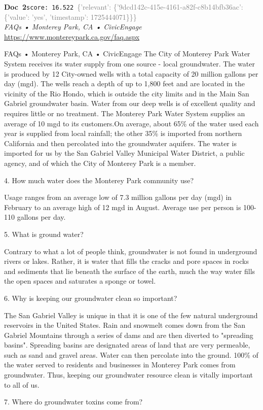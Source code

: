 \documentclass[a4paper,11pt]{article}
\begin{document}
\begin{docenv}
{\footnotesize\textcolor{doccolor}{\textbf{Doc~2}}}\hfill{\tiny\texttt{score:~16.522}}\ {\tiny\textcolor{gray}{\{'relevant': \{'9dcd142c-415e-4161-a82f-c8b14bfb36ac': \{'value': 'yes', 'timestamp': 1725444071\}\}\}}}\\[3pt]
{\small\textit{FAQs • Monterey Park, CA • CivicEngage}}\\[2pt]
{\tiny\url{https://www.montereypark.ca.gov/faq.aspx}}\\[4pt]
{\footnotesize FAQs • Monterey Park, CA • CivicEngage
The City of Monterey Park Water System receives its water supply from one source - local groundwater. The water is produced by 12 City-owned wells with a total capacity of 20 million gallons per day (mgd). The wells reach a depth of up to 1,800 feet and are located in the vicinity of the Rio Hondo, which is outside the city limits and in the Main San Gabriel groundwater basin. Water from our deep wells is of excellent quality and requires little or no treatment. The Monterey Park Water System supplies an average of 10 mgd to its customers.On average, about 65\% of the water used each year is supplied from local rainfall; the other 35\% is imported from northern California and then percolated into the groundwater aquifers. The water is imported for us by the San Gabriel Valley Municipal Water District, a public agency, and of which the City of Monterey Park is a member.	

4.
How much water does the Monterey Park community use?

Usage ranges from an average low of 7.3 million gallons per day (mgd) in February to an average high of 12 mgd in August. Average use per person is 100-110 gallons per day.	

5.
What is ground water?

Contrary to what a lot of people think, groundwater is not found in underground rivers or lakes. Rather, it is water that fills the cracks and pore spaces in rocks and sediments that lie beneath the surface of the earth, much the way water fills the open spaces and saturates a sponge or towel. 	

6.
Why is keeping our groundwater clean so important?

The San Gabriel Valley is unique in that it is one of the few natural underground reservoirs in the United States. Rain and snowmelt comes down from the San Gabriel Mountains through a series of dams and are then diverted to "spreading basins". Spreading basins are designated areas of land that are very permeable, such as sand and gravel areas. Water can then percolate into the ground. 100\% of the water served to residents and businesses in Monterey Park comes from groundwater. Thus, keeping our groundwater resource clean is vitally important to all of us. 	

7.
Where do groundwater toxins come from?}
\end{docenv}
\end{document}
